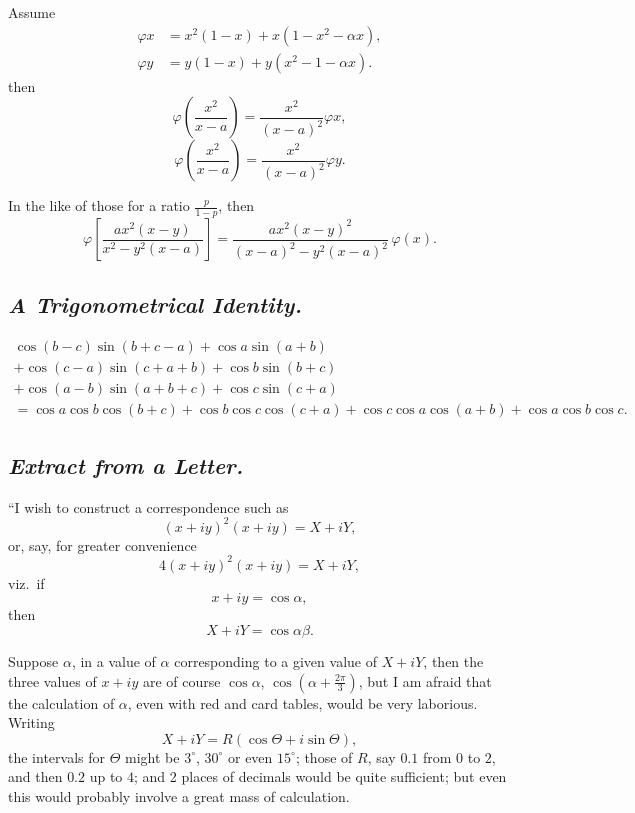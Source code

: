 \documentclass[12pt,a4paper,oneside]{book}
\theoremstyle{plain}
\theoremstyle{definition}
\theoremstyle{remark}
\newcommand{\ph}{\varphi}
\begin{document}
Assume
\begin{align*}
\ph x&=x^2(1-x)+x(1-x^2-\alpha x),\\
\ph y&=y(1-x)+y(x^2-1-\alpha x).
\end{align*}
then
\[
\ph\left(\frac{x^2}{x-a}\right)=\frac{x^2}{(x-a)^2}\ph x,
\]
\[
\ph\left(\frac{x^2}{x-a}\right)=\frac{x^2}{(x-a)^2}\ph y.
\]

In the like of those for a ratio $\frac{p}{1-p}$, then
\[
\ph\left[\frac{ax^2(x-y)}{x^2-y^2(x-a)}\right]=\frac{ax^2(x-y)^2}{(x-a)^2-y^2(x-a)^2}\,\ph(x).
\]

\newpage
\subsection*{\textit{A Trigonometrical Identity.}}

\begin{align*}
\cos(b-c)\sin(b+c-a)+\cos a\sin(a+b)\\
+\cos(c-a)\sin(c+a+b)+\cos b\sin(b+c)\\
+\cos(a-b)\sin(a+b+c)+\cos c\sin(c+a)\\
=\cos a\cos b\cos(b+c)+\cos b\cos c\cos(c+a)+\cos c\cos a\cos(a+b)+\cos a\cos b\cos c.
\end{align*}

\subsection*{\textit{Extract from a Letter.}}

``I wish to construct a correspondence such as
\[
(x+iy)^2(x+iy)=X+iY,
\]
or, say, for greater convenience
\[
4(x+iy)^2(x+iy)=X+iY,
\]
viz.\ if
\[
x+iy=\cos\alpha,
\]
then
\[
X+iY=\cos\alpha\beta.
\]

Suppose $\alpha$, in a value of $\alpha$ corresponding to a given value of $X+iY$, then the three values of $x+iy$ are of course $\cos\alpha$, $\cos\left(\alpha+\frac{2\pi}{3}\right)$, but I am afraid that the calculation of $\alpha$, even with red and card tables, would be very laborious. Writing
\[
X+iY=R(\cos\Theta+i\sin\Theta),
\]
the intervals for $\Theta$ might be $3^\circ$, $30^\circ$ or even $15^\circ$; those of $R$, say $0.1$ from $0$ to $2$, and then $0.2$ up to $4$; and 2 places of decimals would be quite sufficient; but even this would probably involve a great mass of calculation.
\end{document}
